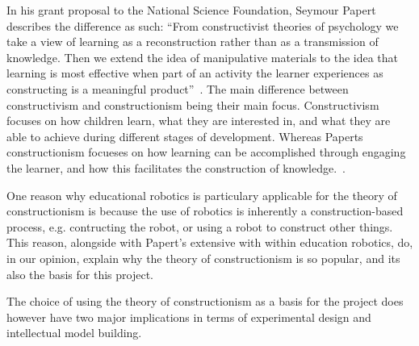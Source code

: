 \bigskip\noindent
In his grant proposal to the National Science Foundation, Seymour Papert describes the difference as such:  ``From constructivist theories of psychology we take a view of learning as a reconstruction rather than as a transmission of knowledge. Then we extend the idea of manipulative materials to the idea that learning is most effective when part of an activity the learner experiences as constructing is a meaningful product''~\cite{papertGrant}. 
The main difference between constructivism and constructionism being their main focus. Constructivism focuses on how children learn, what they are interested in, and what they are able to achieve during different stages of development. Whereas Paperts constructionism focueses on how learning can be accomplished through engaging the learner, and how this facilitates the construction of knowledge.~\cite{ackermann2001piaget}.



\bigskip\noindent
One reason why educational robotics is particulary applicable for the theory of constructionism is because the use of robotics is inherently a construction-based process, e.g. contructing the robot, or using a robot to construct other things. This reason, alongside with Papert's extensive with within education robotics, do, in our opinion, explain why the theory of constructionism is so popular, and its also the basis for this project. 

\bigskip\noindent
The choice of using the theory of constructionism as a basis for the project does however have two major implications in terms of experimental design and intellectual model building. 

